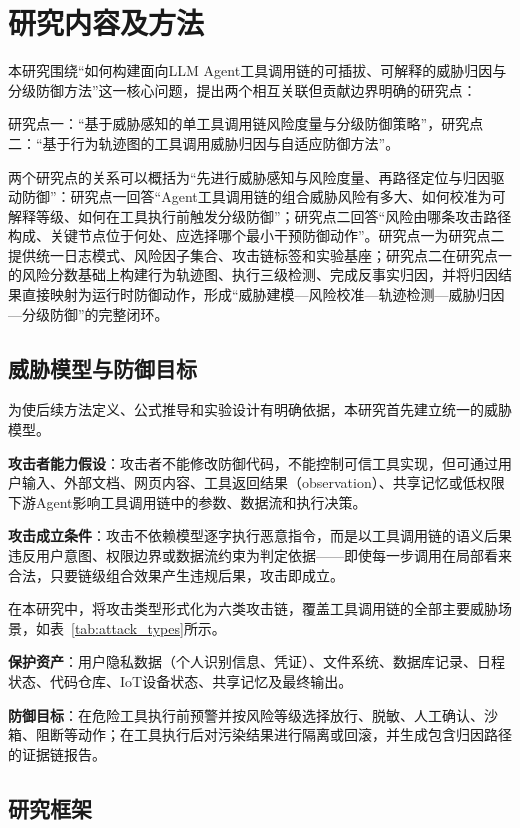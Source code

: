 \section{研究内容及方法}

本研究围绕“如何构建面向LLM Agent工具调用链的可插拔、可解释的威胁归因与分级防御方法”这一核心问题，提出两个相互关联但贡献边界明确的研究点：

研究点一：“基于威胁感知的单工具调用链风险度量与分级防御策略”，研究点二：“基于行为轨迹图的工具调用威胁归因与自适应防御方法”。

两个研究点的关系可以概括为“先进行威胁感知与风险度量、再路径定位与归因驱动防御”：研究点一回答“Agent工具调用链的组合威胁风险有多大、如何校准为可解释等级、如何在工具执行前触发分级防御”；研究点二回答“风险由哪条攻击路径构成、关键节点位于何处、应选择哪个最小干预防御动作”。研究点一为研究点二提供统一日志模式、风险因子集合、攻击链标签和实验基座；研究点二在研究点一的风险分数基础上构建行为轨迹图、执行三级检测、完成反事实归因，并将归因结果直接映射为运行时防御动作，形成“威胁建模—风险校准—轨迹检测—威胁归因—分级防御”的完整闭环。

\subsection{威胁模型与防御目标}

为使后续方法定义、公式推导和实验设计有明确依据，本研究首先建立统一的威胁模型。

\textbf{攻击者能力假设}：攻击者不能修改防御代码，不能控制可信工具实现，但可通过用户输入、外部文档、网页内容、工具返回结果（observation）、共享记忆或低权限下游Agent影响工具调用链中的参数、数据流和执行决策。

\textbf{攻击成立条件}：攻击不依赖模型逐字执行恶意指令，而是以工具调用链的语义后果违反用户意图、权限边界或数据流约束为判定依据——即使每一步调用在局部看来合法，只要链级组合效果产生违规后果，攻击即成立。

在本研究中，将攻击类型形式化为六类攻击链，覆盖工具调用链的全部主要威胁场景，如表~\ref{tab:attack_types}所示。



\textbf{保护资产}：用户隐私数据（个人识别信息、凭证）、文件系统、数据库记录、日程状态、代码仓库、IoT设备状态、共享记忆及最终输出。

\textbf{防御目标}：在危险工具执行前预警并按风险等级选择放行、脱敏、人工确认、沙箱、阻断等动作；在工具执行后对污染结果进行隔离或回滚，并生成包含归因路径的证据链报告。

\subsection{研究框架}


